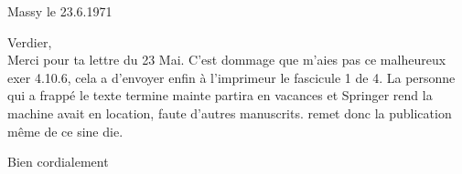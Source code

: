 \begin{flushright}
Massy le 23.6.1971\\
\end{flushright}
 Verdier,\\

Merci pour ta lettre du 23 Mai. C'est dommage que   m'aies pas  ce malheureux exer 4.10.6, cela a  d'envoyer enfin à l'imprimeur le fascicule 1 de  4. La personne qui a frappé le texte termine mainte  partira en vacances et Springer rend la machine  avait en location, faute d'autres manuscrits.  remet donc la publication même de ce  sine die.

Bien cordialement\\
